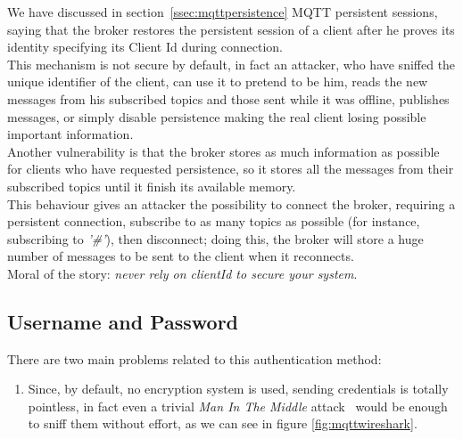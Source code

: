 \documentclass[12pt]{report}
\begin{document}
{{We have discussed in section~\ref{ssec:mqttpersistence} MQTT persistent sessions, saying that the broker restores the persistent session of a client after he proves its identity specifying its Client Id during connection.\\
This mechanism is not secure by default, in fact an attacker, who have sniffed the unique identifier of the client, can use it to pretend to be him, reads the new messages from his subscribed topics and those sent while it was offline, publishes messages, or simply disable persistence making the real client losing possible important information.\\
Another vulnerability is that the broker stores as much information as possible for clients who have requested persistence, so it stores all the messages from their subscribed topics until it finish its available memory.\\
This behaviour gives an attacker the possibility to connect the broker, requiring a persistent connection, subscribe to as many topics as possible (for instance, subscribing to \emph{'\#'}), then disconnect; doing this, the broker will store a huge number of messages to be sent to the client when it reconnects.\\

Moral of the story: \emph{never rely on clientId to secure your system}.\\

\subsection{Username and Password}
\bigskip
There are two main problems related to this authentication method:

\begin{enumerate}
\setlength{\itemindent}{+4mm}
  \item Since, by default, no encryption system is used, sending credentials is totally pointless, in fact even a trivial \emph{Man In The Middle} attack~\cite{mitmwiki} would be enough to sniff them without effort, as we can see in figure \ref{fig:mqttwireshark}.


\end{enumerate}}}
\end{document}
